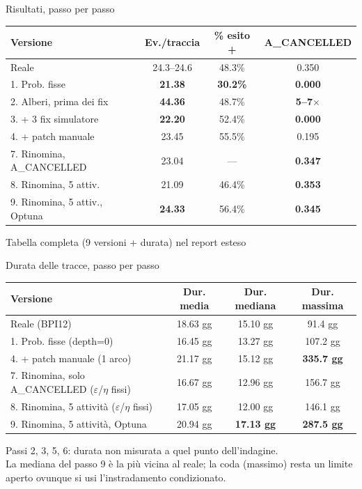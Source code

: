 \documentclass[11pt,aspectratio=169]{beamer}
\newcommand{\good}[1]{\textcolor{goodcol}{\textbf{#1}}}
\newcommand{\warncell}[1]{\textcolor{warncol}{\textbf{#1}}}
\newcommand{\badcell}[1]{\textcolor{badcol}{\textbf{#1}}}
\newcommand{\dashcell}{\textcolor{inkfaint}{---}}
\begin{document}
\begin{frame}{Risultati, passo per passo}
\centering
\scriptsize
\begin{tabular}{lccc}
\toprule
\textbf{Versione} & \textbf{Ev./traccia} & \textbf{\% esito +} & \textbf{A\_CANCELLED} \\
\midrule
\rowcolor{accentsoft} Reale & 24.3--24.6 & 48.3\% & 0.350 \\
1. Prob. fisse & \warncell{21.38} & \warncell{30.2\%} & \badcell{0.000} \\
2. Alberi, prima dei fix & \badcell{44.36} & 48.7\% & \badcell{5--7$\times$} \\
3. + 3 fix simulatore & \good{22.20} & 52.4\% & \badcell{0.000} \\
4. + patch manuale & 23.45 & 55.5\% & 0.195 \\
7. Rinomina, A\_CANCELLED & 23.04 & \dashcell & \good{0.347} \\
8. Rinomina, 5 attiv. & 21.09 & 46.4\% & \good{0.353} \\
\rowcolor{accentsoft} 9. Rinomina, 5 attiv., Optuna & \good{24.33} & 56.4\% & \good{0.345} \\
\bottomrule
\end{tabular}
\vspace{1em}

{\small Tabella completa (9 versioni + durata) nel report esteso}
\end{frame}

\begin{frame}{Durata delle tracce, passo per passo}
\centering
\small
\begin{tabular}{lccc}
\toprule
\textbf{Versione} & \textbf{Dur. media} & \textbf{Dur. mediana} & \textbf{Dur. massima} \\
\midrule
\rowcolor{accentsoft} Reale (BPI12) & 18.63 gg & 15.10 gg & 91.4 gg \\
1. Prob. fisse (depth=0) & 16.45 gg & 13.27 gg & 107.2 gg \\
4. + patch manuale (1 arco) & 21.17 gg & 15.12 gg & \warncell{335.7 gg} \\
7. Rinomina, solo A\_CANCELLED ($\varepsilon$/$\eta$ fissi) & 16.67 gg & 12.96 gg & 156.7 gg \\
8. Rinomina, 5 attivit\`a ($\varepsilon$/$\eta$ fissi) & 17.05 gg & 12.00 gg & 146.1 gg \\
\rowcolor{accentsoft} 9. Rinomina, 5 attivit\`a, Optuna & 20.94 gg & \good{17.13 gg} & \warncell{287.5 gg} \\
\bottomrule
\end{tabular}
\vspace{0.8em}

{\small Passi 2, 3, 5, 6: durata non misurata a quel punto dell'indagine.\\
La mediana del passo 9 \`e la pi\`u vicina al reale; la coda (massimo) resta un limite aperto ovunque si usi l'instradamento condizionato.}
\end{frame}
\end{document}
